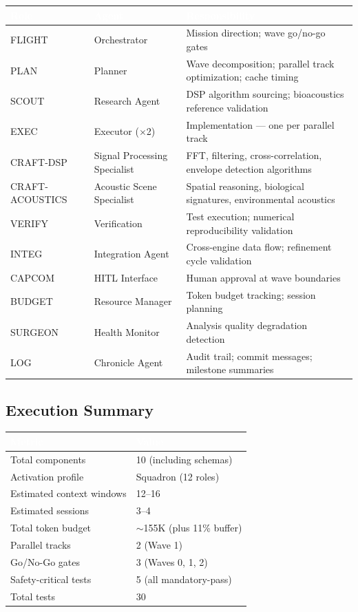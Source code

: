 \documentclass[11pt,letterpaper]{article}
\newcommand{\tableheader}[1]{\textbf{\sffamily\textcolor{white}{#1}}}
\begin{document}
\begin{center}
\begin{tabularx}{\textwidth}{L{2cm}L{3cm}X}
\toprule
{}
\tableheader{Role} & \tableheader{Agent} & \tableheader{Responsibility} \\
\midrule
FLIGHT & Orchestrator & Mission direction; wave go/no-go gates \\
PLAN & Planner & Wave decomposition; parallel track optimization; cache timing \\
SCOUT & Research Agent & DSP algorithm sourcing; bioacoustics reference validation \\
EXEC & Executor ($\times$2) & Implementation --- one per parallel track \\
CRAFT-DSP & Signal Processing Specialist & FFT, filtering, cross-correlation, envelope detection algorithms \\
CRAFT-ACOUSTICS & Acoustic Scene Specialist & Spatial reasoning, biological signatures, environmental acoustics \\
VERIFY & Verification & Test execution; numerical reproducibility validation \\
INTEG & Integration Agent & Cross-engine data flow; refinement cycle validation \\
CAPCOM & HITL Interface & Human approval at wave boundaries \\
BUDGET & Resource Manager & Token budget tracking; session planning \\
SURGEON & Health Monitor & Analysis quality degradation detection \\
LOG & Chronicle Agent & Audit trail; commit messages; milestone summaries \\
\bottomrule
\end{tabularx}
\end{center}

\subsection{Execution Summary}

\begin{center}
\begin{tabularx}{\textwidth}{L{5cm}X}
\toprule
{}
\tableheader{Metric} & \tableheader{Value} \\
\midrule
Total components & 10 (including schemas) \\
Activation profile & Squadron (12 roles) \\
Estimated context windows & 12--16 \\
Estimated sessions & 3--4 \\
Total token budget & $\sim$155K (plus 11\% buffer) \\
Parallel tracks & 2 (Wave 1) \\
Go/No-Go gates & 3 (Waves 0, 1, 2) \\
Safety-critical tests & 5 (all mandatory-pass) \\
Total tests & 30 \\
\bottomrule
\end{tabularx}
\end{center}
\end{document}
